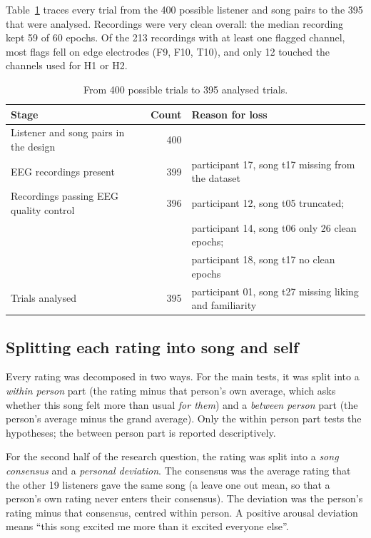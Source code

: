 \documentclass[11pt,a4paper]{article}
\begin{document}
Table~\ref{tab:qc} traces every trial from the 400 possible listener and song pairs to the 395 that were analysed. Recordings were very clean overall: the median recording kept 59 of 60 epochs. Of the 213 recordings with at least one flagged channel, most flags fell on edge electrodes (F9, F10, T10), and only 12 touched the channels used for H1 or H2.

\begin{table}[!htb]
\centering
\caption{From 400 possible trials to 395 analysed trials.}
\label{tab:qc}
\small
\begin{tabular}{lrp{7.2cm}}
\toprule
Stage & Count & Reason for loss \\
\midrule
Listener and song pairs in the design & 400 & \\
EEG recordings present & 399 & participant 17, song t17 missing from the dataset \\
Recordings passing EEG quality control & 396 & participant 12, song t05 truncated; \\
 & & participant 14, song t06 only 26 clean epochs; \\
 & & participant 18, song t17 no clean epochs \\
Trials analysed & 395 & participant 01, song t27 missing liking and familiarity \\
\bottomrule
\end{tabular}
\end{table}

\subsection{Splitting each rating into song and self}

Every rating was decomposed in two ways. For the main tests, it was split into a \emph{within person} part (the rating minus that person's own average, which asks whether this song felt more than usual \emph{for them}) and a \emph{between person} part (the person's average minus the grand average). Only the within person part tests the hypotheses; the between person part is reported descriptively.

For the second half of the research question, the rating was split into a \emph{song consensus} and a \emph{personal deviation}. The consensus was the average rating that the other 19 listeners gave the same song (a leave one out mean, so that a person's own rating never enters their consensus). The deviation was the person's rating minus that consensus, centred within person. A positive arousal deviation means ``this song excited me more than it excited everyone else''.
\end{document}
